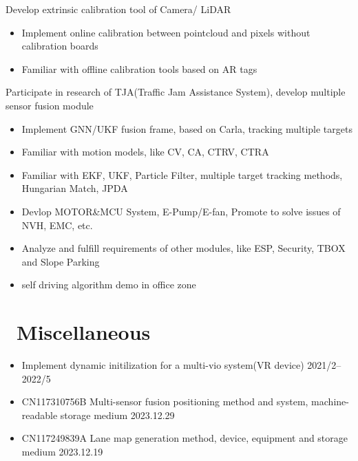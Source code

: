 \documentclass{resume}
\begin{document}
Develop extrinsic calibration tool of Camera/ LiDAR
\begin{itemize}
  \item Implement online calibration between pointcloud and pixels without calibration boards
  \item Familiar with offline calibration tools based on AR tags
\end{itemize}

Participate in research of TJA(Traffic Jam Assistance System), develop multiple sensor fusion module
\begin{itemize}
  \item Implement GNN/UKF fusion frame, based on Carla, tracking multiple targets
  \item Familiar with motion models, like CV, CA, CTRV, CTRA
  \item Familiar with EKF, UKF, Particle Filter, multiple target tracking methods, Hungarian Match, JPDA
\end{itemize}


\begin{itemize}
  \item Devlop MOTOR\&MCU System, E-Pump/E-fan, Promote to solve issues of NVH, EMC, etc.
  \item Analyze and fulfill requirements of other modules, like ESP, Security, TBOX and Slope Parking
  \item self driving algorithm demo in office zone
\end{itemize}


\section{\faCode\ Miscellaneous}
\begin{itemize}[parsep=0.5ex]
  \item Implement dynamic initilization for a multi-vio system(VR device) {2021/2--2022/5}
  \item CN117310756B Multi-sensor fusion positioning method and system, machine-readable storage medium 2023.12.29
  \item CN117249839A Lane map generation method, device, equipment and storage medium 2023.12.19
\end{itemize}

%
%
\end{document}
